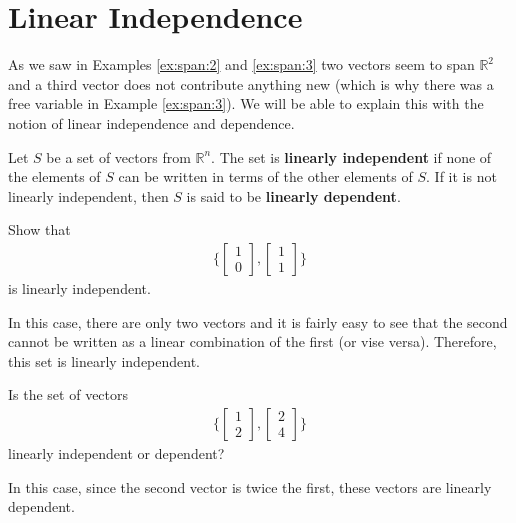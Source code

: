 \vfill \pagebreak

\section{Linear Independence}
\label{sect:linear:ind}

As we saw in Examples \ref{ex:span:2} and \ref{ex:span:3}  two vectors seem to span $\mathbb{R}^2$ and a third vector does not contribute anything new (which is why there was a free variable in Example \ref{ex:span:3}).  We will be able to explain this with the notion of linear independence and dependence.

\begin{definition}
Let $S$ be a set of vectors from $\mathbb{R}^n$.  The set is \textbf{linearly independent} if none of the elements of $S$ can be written in terms of the other elements of $S$.    If it is not linearly independent, then $S$ is said to be \textbf{linearly dependent}.
\end{definition}

\begin{example}
Show that
\begin{align*}
\{
\begin{bmatrix}
1 \\ 0
\end{bmatrix}, \begin{bmatrix}
1 \\ 1
\end{bmatrix} \}
\end{align*}
is linearly independent.

\solution

In this case, there are only two vectors and it is fairly easy to see that the second cannot be written as a linear combination of the first (or vise versa).  Therefore, this set is linearly independent.
\end{example}

\begin{example}
Is the set of vectors
\begin{align*}
\{
\begin{bmatrix}
1 \\ 2
\end{bmatrix}, \begin{bmatrix}
2 \\ 4
\end{bmatrix} \}
\end{align*}
linearly independent or dependent?

\solution

In this case, since the second vector is twice the first, these vectors are linearly dependent.

\end{example}


